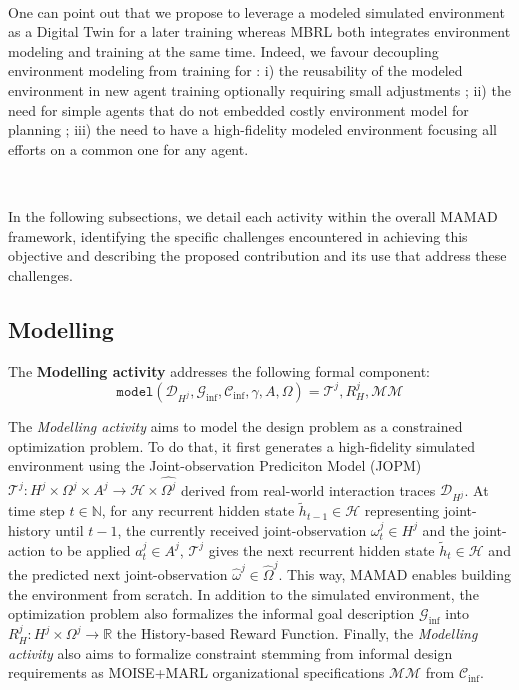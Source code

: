\documentclass[pdflatex,sn-mathphys-num]{sn-jnl}%
\theoremstyle{thmstyleone}%
\theoremstyle{thmstyletwo}%
\theoremstyle{thmstylethree}%
\begin{document}
\

\noindent One can point out that we propose to leverage a modeled simulated environment as a Digital Twin for a later training whereas MBRL both integrates environment modeling and training at the same time. Indeed, we favour decoupling environment modeling from training for : i) the reusability of the modeled environment in new agent training optionally requiring small adjustments ; \quad ii) the need for simple agents that do not embedded costly environment model for planning ; \quad iii) the need to have a high-fidelity modeled environment focusing all efforts on a common one for any agent.

\

\noindent In the following subsections, we detail each activity within the overall MAMAD framework, identifying the specific challenges encountered in achieving this objective and describing the proposed contribution and its use that address these challenges.

\subsection{Modelling}\label{sec:modelling}

The \textbf{Modelling activity} addresses the following formal component:
\begin{displaymath}
\texttt{model}(\mathcal{D}_{H^j}, \mathcal{G}_{\text{inf}}, \mathcal{C}_{\text{inf}}, \gamma, A, \Omega) = \mathcal{T}^j, R^j_H, \mathcal{MM} 
\end{displaymath}

\noindent The \textit{Modelling activity} aims to model the design problem as a constrained optimization problem. To do that, it first generates a high-fidelity simulated environment using the Joint-observation Prediciton Model (JOPM) $\mathcal{T}^j: H^j \times \Omega^j \times A^j \rightarrow \mathcal{H} \times \hat{\Omega^j}$ derived from real-world interaction traces $\mathcal{D}_{H^j}$. At time step $t \in \mathbb{N}$, for any recurrent hidden state $\tilde{h}_{t-1} \in \mathcal{H}$ representing joint-history until $t-1$, the currently received joint-observation $\omega_t^j \in H^j$ and the joint-action to be applied $a_t^j \in A^j$, $\mathcal{T}^j$ gives the next recurrent hidden state $\tilde{h}_t \in \mathcal{H}$ and the predicted next joint-observation $\hat{\omega}^j \in \hat{\Omega}^j$. This way, MAMAD enables building the environment from scratch. In addition to the simulated environment, the optimization problem also formalizes the informal goal description $\mathcal{G}_{\text{inf}}$ into $R^j_H: H^j \times \Omega^j \rightarrow \mathbb{R}$ the History-based Reward Function. Finally, the \textit{Modelling activity} also aims to formalize constraint stemming from informal design requirements as MOISE+MARL organizational specifications $\mathcal{MM}$ from $\mathcal{C}_{\text{inf}}$.
\end{document}
